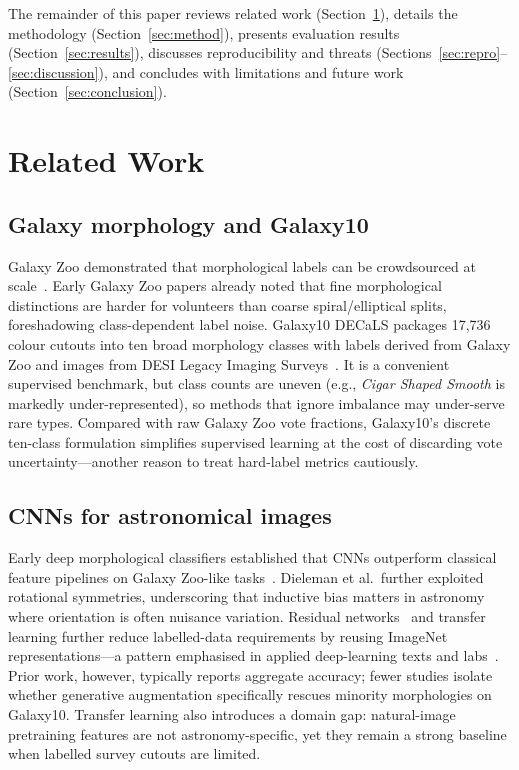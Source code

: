 \documentclass[conference]{IEEEtran}
\begin{document}
The remainder of this paper reviews related work (Section~\ref{sec:related}), details the methodology (Section~\ref{sec:method}), presents evaluation results (Section~\ref{sec:results}), discusses reproducibility and threats (Sections~\ref{sec:repro}--\ref{sec:discussion}), and concludes with limitations and future work (Section~\ref{sec:conclusion}).

\section{Related Work}
\label{sec:related}

\subsection{Galaxy morphology and Galaxy10}
Galaxy Zoo demonstrated that morphological labels can be crowdsourced at scale~\cite{lintott2008galaxy,willett2013galaxy}. Early Galaxy Zoo papers already noted that fine morphological distinctions are harder for volunteers than coarse spiral/elliptical splits, foreshadowing class-dependent label noise. Galaxy10 DECaLS packages 17{,}736 colour cutouts into ten broad morphology classes with labels derived from Galaxy Zoo and images from DESI Legacy Imaging Surveys~\cite{leung2019astronn,walmsley2022galaxy,dey2019legacy}. It is a convenient supervised benchmark, but class counts are uneven (e.g., \emph{Cigar Shaped Smooth} is markedly under-represented), so methods that ignore imbalance may under-serve rare types. Compared with raw Galaxy Zoo vote fractions, Galaxy10's discrete ten-class formulation simplifies supervised learning at the cost of discarding vote uncertainty---another reason to treat hard-label metrics cautiously.

\subsection{CNNs for astronomical images}
Early deep morphological classifiers established that CNNs outperform classical feature pipelines on Galaxy Zoo-like tasks~\cite{dieleman2015rotation}. Dieleman et al.\ further exploited rotational symmetries, underscoring that inductive bias matters in astronomy where orientation is often nuisance variation. Residual networks~\cite{he2016deep} and transfer learning further reduce labelled-data requirements by reusing ImageNet representations---a pattern emphasised in applied deep-learning texts and labs~\cite{hope2017tensorflow,aggarwal2018neural}. Prior work, however, typically reports aggregate accuracy; fewer studies isolate whether generative augmentation specifically rescues minority morphologies on Galaxy10. Transfer learning also introduces a domain gap: natural-image pretraining features are not astronomy-specific, yet they remain a strong baseline when labelled survey cutouts are limited.
\end{document}
